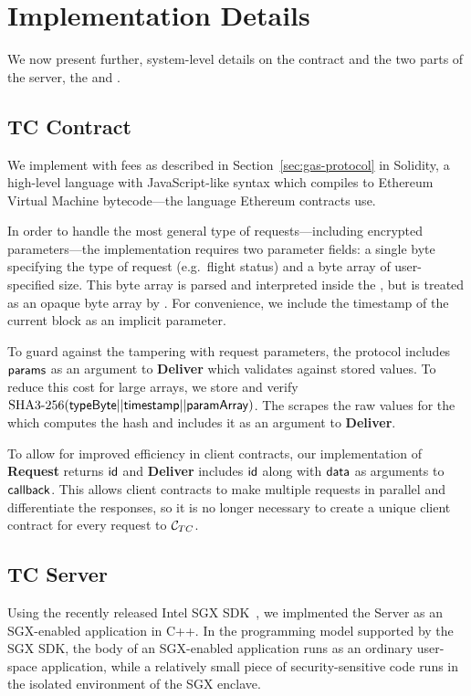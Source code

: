 
\section{\tc Implementation Details}
\label{sec:impl}

We now present further, system-level details on the \tc contract \tcont and the two parts of the \tc server, the \encname and \medname.

\subsection{TC Contract} 

We implement \tcont with fees as described in Section~\ref{sec:gas-protocol} in Solidity,
a high-level language with JavaScript-like syntax which compiles to Ethereum Virtual Machine bytecode---the language Ethereum contracts use.

In order to handle the most general type of requests---including encrypted parameters---the \tcont implementation requires two parameter fields:
a single byte specifying the type of request (e.g.~flight status) and a byte array of user-specified size.
This byte array is parsed and interpreted inside the \encname, but is treated as an opaque byte array by \tcont.
For convenience, we include the timestamp of the current block as an implicit parameter.

To guard against the \medname tampering with request parameters, the \tcont protocol includes ${\sf params}$ as an argument to {\bf Deliver} which validates against stored values.
To reduce this cost for large arrays, we store and verify $\text{SHA3-256}({\sf typeByte} || {\sf timestamp} || {\sf paramArray})$.
The \medname scrapes the raw values for the \encname which computes the hash and includes it as an argument to {\bf Deliver}.

To allow for improved efficiency in client contracts, our implementation of {\bf Request} returns ${\sf id}$
and {\bf Deliver} includes ${\sf id}$ along with ${\sf data}$ as arguments to ${\sf callback}$.
This allows client contracts to make multiple requests in parallel and differentiate the responses,
so it is no longer necessary to create a unique client contract for every request to ${\cal C}_{TC}$.



\subsection{TC Server}
Using the recently released Intel SGX SDK~\cite{sgxsdk}, we implmented the \tc
Server as an SGX-enabled application in C++. In the programming model supported
by the SGX SDK, the body of an SGX-enabled application runs as an ordinary
user-space application, while a relatively small piece of security-sensitive
code runs in the isolated environment of the SGX enclave.

